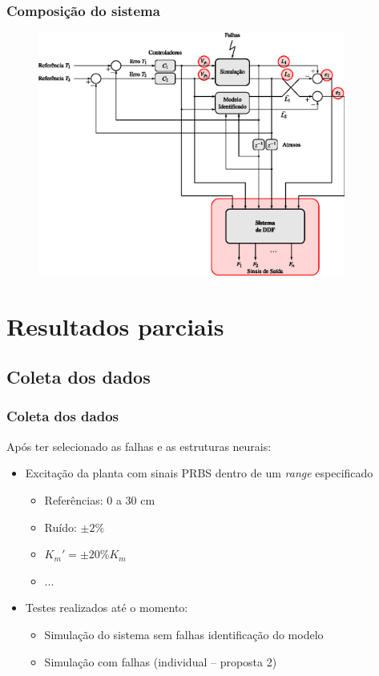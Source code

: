 \documentclass{beamer}
\begin{document}
\begin{frame}
    \frametitle{Composição do sistema}

\begin{figure}[htb]
\centering
    \includegraphics[width=0.9\textwidth]{imgs/sistema/eps/composicao_mod_8}
\end{figure}
\end{frame}

\section{Resultados parciais}
\subsection{Coleta dos dados}

\begin{frame}
    \frametitle{Coleta dos dados}

    Após ter selecionado as falhas e as estruturas neurais:

\begin{itemize}
    \item Excitação da planta com sinais PRBS dentro de um {\it range}
          especificado
    \begin{itemize}
        \item Referências: 0 a 30 cm
        \item Ruído: $\pm 2\%$
        \item $K_m' = \pm 20\% K_m$
        \item ...
    \end{itemize}
    \item Testes realizados até o momento:
    \begin{itemize}
        \item Simulação do sistema sem falhas \implica identificação do modelo
        \item Simulação com falhas (individual -- proposta 2)
    \end{itemize}
\end{itemize}
\end{frame}
\end{document}
